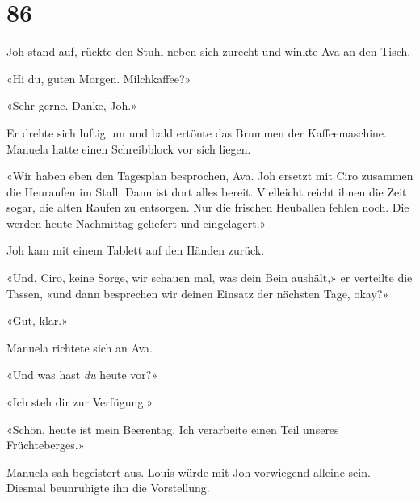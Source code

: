 \chapter{86}



Joh stand auf, rückte den Stuhl neben sich zurecht und winkte Ava an den Tisch.

«Hi du, guten Morgen. Milchkaffee?»

«Sehr gerne. Danke, Joh.»

Er drehte sich luftig um und bald ertönte das Brummen der Kaffeemaschine.
Manuela hatte einen Schreibblock vor sich liegen.

«Wir haben eben den Tagesplan besprochen, Ava. Joh ersetzt mit Ciro
zusammen die Heuraufen im Stall. Dann ist dort alles bereit. Vielleicht
reicht ihnen die Zeit sogar, die alten Raufen zu entsorgen. Nur die
frischen Heuballen fehlen noch. Die werden heute Nachmittag geliefert
und eingelagert.»

Joh kam mit einem Tablett auf den Händen zurück.

«Und, Ciro, keine Sorge, wir schauen mal, was dein Bein aushält,» er
verteilte die Tassen, «und dann besprechen wir deinen Einsatz der
nächsten Tage, okay?»

«Gut, klar.»

Manuela richtete sich an Ava.

«Und was hast \emph{du} heute vor?»

«Ich steh dir zur Verfügung.»

«Schön, heute ist mein Beerentag. Ich verarbeite einen Teil unseres
Früchteberges.»

Manuela sah begeistert aus. Louis würde mit Joh vorwiegend alleine sein. Diesmal beunruhigte ihn die Vorstellung. 

\sectionbreak

